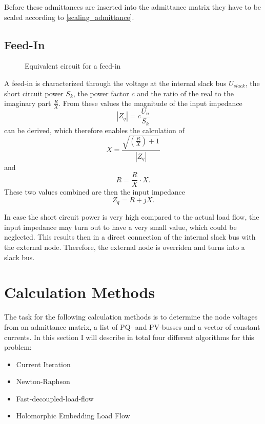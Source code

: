 Before these admittances are inserted into the admittance matrix they have to be scaled according to \eqref{scaling_admittance}.

\subsection{Feed-In}

\begin{figure}
	\centering
	
	\caption{Equivalent circuit for a feed-in}
	\label{fig:feedin}
\end{figure}

A feed-in  is characterized through the voltage at the internal slack bus $U_{slack}$, the short circuit power $S_k$, the power factor $c$ and the ratio of the real to the imaginary part $\frac{R}{X}$. From these values the magnitude of the input impedance 
\begin{equation}
	|Z_q| = c \frac{U_n}{S_k}
\end{equation}
can be derived, which therefore enables the calculation of
\begin{equation}
	X = \frac{\sqrt{\left( \frac{R}{X} \right) + 1}}{|Z_q|}
\end{equation}
and
\begin{equation}
	R = \frac{R}{X} \cdot X.
\end{equation}
These two values combined are then the input impedance
\begin{equation}
	Z_q = R + j X.
\end{equation}

In case the short circuit power is very high compared to the actual load flow, the input impedance may turn out to have a very small value, which could be neglected. This results then in a direct connection of the internal slack bus with the external node. Therefore, the external node is overriden and turns into a slack bus.

\section{Calculation Methods}

The task for the following calculation methods is to determine the node voltages from an admittance matrix, a list of PQ- and PV-busses and a vector of constant currents. In this section I will describe in total four different algorithms for this problem:
\begin{itemize}
	\item Current Iteration \citep[p. 209]{powerSystemAnalysis}
	\item Newton-Raphson \citep[p. 232]{powerSystemAnalysis}
	\item Fast-decoupled-load-flow \citep[p. 240]{powerSystemAnalysis}
	\item Holomorphic Embedding Load Flow \citep{helmIEEE, helmPatentApr2009, helmPatentSept2009}
\end{itemize}

